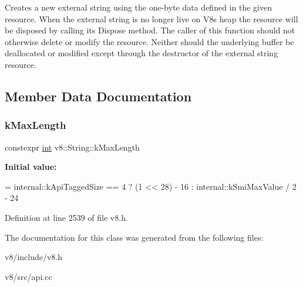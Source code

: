 Creates a new external string using the one-\/byte data defined in the given resource. When the external string is no longer live on V8\textquotesingle{}s heap the resource will be disposed by calling its Dispose method. The caller of this function should not otherwise delete or modify the resource. Neither should the underlying buffer be deallocated or modified except through the destructor of the external string resource. 

\subsection{Member Data Documentation}
\mbox{\label{classv8_1_1String_a66259940a4836974906729017ff25fd2}} 
\subsubsection{\texorpdfstring{k\+Max\+Length}{kMaxLength}}
{\footnotesize\ttfamily constexpr \mbox{\hyperlink{classint}{int}} v8\+::\+String\+::k\+Max\+Length\hspace{0.3cm}{\ttfamily [static]}}

{\bfseries Initial value\+:}
\begin{DoxyCode}
= internal::kApiTaggedSize == 4
                                        ? (1 << 28) - 16
                                        : internal::kSmiMaxValue / 2 - 24
\end{DoxyCode}


Definition at line 2539 of file v8.\+h.



The documentation for this class was generated from the following files\+:\begin{DoxyCompactItemize}
\item 
v8/include/v8.\+h\item 
v8/src/api.\+cc\end{DoxyCompactItemize}
